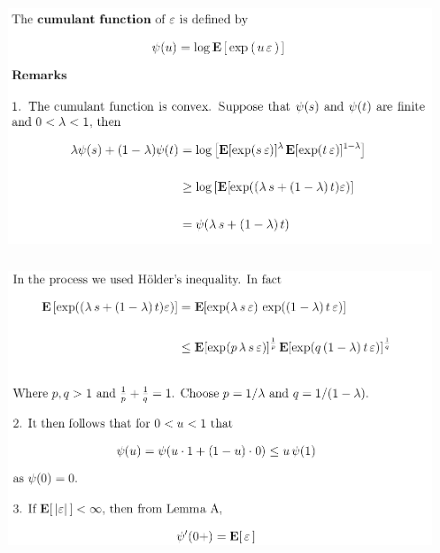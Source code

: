 \documentclass[c, dvipsnames, 8pt]{beamer}
\begin{document}
\begin{frame}[shrink=5]
	
	
	
	\frametitle{\insertsection} 
	\begin{figure}
		\centering
		\includegraphics[width=1\linewidth]{screenshot046}
		\label{fig:screenshot001}
	\end{figure}
	
	
	\frametitle{\insertsection} 
	\begin{figure}
		\centering
		\includegraphics[width=1\linewidth]{screenshot047}
		\label{fig:screenshot001}
	\end{figure}
	
	
	
	
	
\end{frame}
\end{document}
